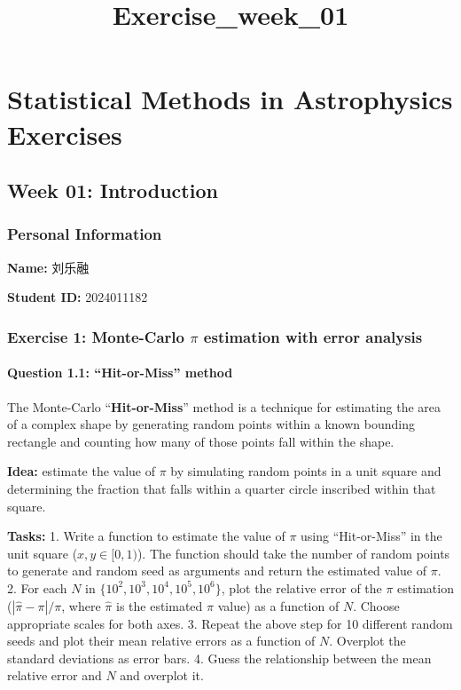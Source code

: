 \documentclass[11pt]{article}
\title{Exercise\_week\_01}
\begin{document}
    
    \maketitle
    
    

    
    \section{Statistical Methods in Astrophysics
Exercises}\label{statistical-methods-in-astrophysics-exercises}

\subsection{Week 01: Introduction}\label{week-01-introduction}

\subsubsection{Personal Information}\label{personal-information}

\textbf{Name:} 刘乐融

\textbf{Student ID:} 2024011182

    \subsubsection{\texorpdfstring{Exercise 1: Monte-Carlo \(\pi\)
estimation with error
analysis}{Exercise 1: Monte-Carlo \textbackslash pi estimation with error analysis}}\label{exercise-1-monte-carlo-pi-estimation-with-error-analysis}

\paragraph{Question 1.1: ``Hit-or-Miss''
method}\label{question-1.1-hit-or-miss-method}

The Monte-Carlo ``\textbf{Hit-or-Miss}'' method is a technique for
estimating the area of a complex shape by generating random points
within a known bounding rectangle and counting how many of those points
fall within the shape.

\textbf{Idea:} estimate the value of \(\pi\) by simulating random points
in a unit square and determining the fraction that falls within a
quarter circle inscribed within that square.

\textbf{Tasks:} 1. Write a function to estimate the value of \(\pi\)
using ``Hit-or-Miss'' in the unit square (\(x, y \in [0, 1)\)). The
function should take the number of random points to generate and random
seed as arguments and return the estimated value of \(\pi\). 2. For each
\(N\) in \(\{10^2, 10^3, 10^4, 10^5, 10^6\}\), plot the relative error
of the \(\pi\) estimation (\(|\hat{\pi} - \pi| / \pi\), where
\(\hat{\pi}\) is the estimated \(\pi\) value) as a function of \(N\).
Choose appropriate scales for both axes. 3. Repeat the above step for 10
different random seeds and plot their mean relative errors as a function
of \(N\). Overplot the standard deviations as error bars. 4. Guess the
relationship between the mean relative error and \(N\) and overplot it.
\end{document}
